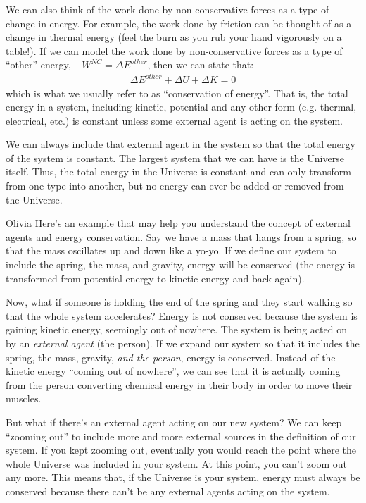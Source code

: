 We can also think of the work done by non-conservative forces as a type of change in energy. For example, the work done by friction can be thought of as a change in thermal energy (feel the burn as you rub your hand vigorously on a table!). If we can model the work done by non-conservative forces as a type of ``other'' energy, $-W^{NC}=\Delta E^{other}$, then we can state that:
\begin{align*}
\Delta E^{other} + \Delta U + \Delta K =0
\end{align*}
which is what we usually refer to as ``conservation of energy''. That is, the total energy in a system, including kinetic, potential and any other form (e.g. thermal, electrical, etc.) is constant unless some external agent is acting on the system. 

We can always include that external agent in the system so that the total energy of the system is constant. The largest system that we can have is the Universe itself. Thus, the total energy in the Universe is constant and can only transform from one type into another, but no energy can ever be added or removed from the Universe.
\begin{studentOpinion}{Olivia}
Here's an example that may help you understand the concept of external agents and energy conservation. Say we have a mass that hangs from a spring, so that the mass oscillates up and down like a yo-yo. If we define our system to include the spring, the mass, and gravity, energy will be conserved (the energy is transformed from potential energy to kinetic energy and back again). 

Now, what if someone is holding the end of the spring and they start walking so that the whole system accelerates? Energy is not conserved because the system is gaining kinetic energy, seemingly out of nowhere. The system is being acted on by an \textit{external agent} (the person). If we expand our system so that it includes the spring, the mass, gravity, \textit{and the person}, energy is conserved. Instead of the kinetic energy ``coming out of nowhere'', we can see that it is actually coming from the person converting chemical energy in their body in order to move their muscles.

But what if there's an external agent acting on our new system? We can keep ``zooming out'' to include more and more external sources in the definition of our system. If you kept zooming out, eventually you would reach the point where the whole Universe was included in your system. At this point, you can't zoom out any more. This means that, if the Universe is your system, energy must always be conserved because there can't be any external agents acting on the system. 
\end{studentOpinion}



